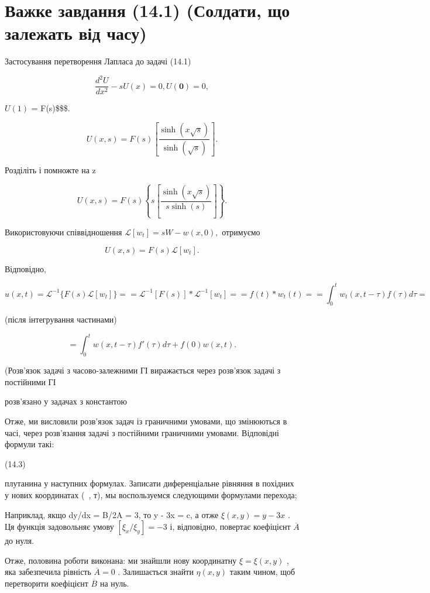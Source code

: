 \documentclass[
  ukrainian,
]{article}
\begin{document}
\section{Важке завдання (14.1) (Солдати, що залежать від
часу)}\label{ux432ux430ux436ux43aux435-ux437ux430ux432ux434ux430ux43dux43dux44f-14.1-ux441ux43eux43bux434ux430ux442ux438-ux449ux43e-ux437ux430ux43bux435ux436ux430ux442ux44c-ux432ux456ux434-ux447ux430ux441ux443}

Застосування перетворення Лапласа до задачі (14.1)

\[
\frac{d^2U}{dx^2} - sU(x) = 0,
U\left( \mathbf{0}\right) =0,
\]

\(U(1)\) = F(s)\$\$\$.

\[
U(x, s) = F(s) \left[ \frac{\sinh(x \sqrt{s})}{\sinh(\sqrt{s})} \right].
\]

Розділіть і помножте на z

\[
U(x, s) = F(s) \left\{ s \left[ \frac{\sinh(x \sqrt{s})}{s \sinh(s)} \right] \right\}.
\]

Використовуючи співвідношення \(\mathscr{L}[w_t] = sW - w(x, 0),\)
отримуємо

\[
U(x, s) = F(s) \mathcal{L}[w_t].
\]

Відповідно,

\[
u(x, t) = \mathcal{L}^{-1} \{ F(s) \mathcal{L}[w_t] \} =
= \mathcal{L}^{-1} [ F(s) ] * \mathcal{L}^{-1}[w_t] =
= f(t) * w_t(t) =
= \int_0^t w_t(x, t-\tau) f(\tau) d\tau =
\]

(після інтегрування частинами)

\[
= \int_{0}^{t} w(x, t-\tau) f'(\tau) d\tau + f(0) w(x, t).
\]

(Розв'язок задачі з часово-залежними ГІ виражається через розв'язок
задачі з постійними ГІ

розв'язано у задачах з константою

Отже, ми висловили розв'язок задач із граничними умовами, що змінюються
в часі, через розв'язання задачі з постійними граничними умовами.
Відповідні формули такі:

(14.3)

плутанина у наступних формулах. Записати диференціальне рівняння в
похідних у нових координатах (~, т), мы воспользуемся следующими
формулами перехода;

Наприклад, якщо dy/dx = B/2A = 3, то y - 3x = c, а отже
\(\xi(x, y) = y - 3x\) . Ця функція задовольняє умову
\([\xi_x/\xi_y] = -3\) і, відповідно, повертає коефіцієнт
\(\overline{A}\) до нуля.

Отже, половина роботи виконана: ми знайшли нову координатну
\(\xi = \xi(x, y)\) , яка забезпечила рівність \(\overline{A} = 0\) .
Залишається знайти \(\eta(x, y)\) таким чином, щоб перетворити
коефіцієнт \(\overline{B}\) на нуль.
\end{document}
